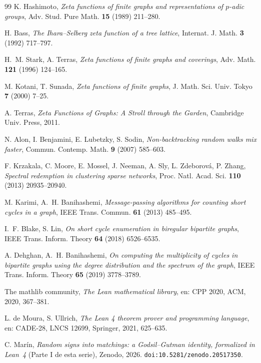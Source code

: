 \documentclass[11pt]{article}
\begin{document}
\begin{thebibliography}{99}
 K. Hashimoto,
\emph{Zeta functions of finite graphs and representations of $p$-adic groups},
Adv. Stud. Pure Math. \textbf{15} (1989) 211--280.

 H. Bass,
\emph{The Ihara--Selberg zeta function of a tree lattice},
Internat. J. Math. \textbf{3} (1992) 717--797.

 H.~M. Stark, A. Terras,
\emph{Zeta functions of finite graphs and coverings}, Adv. Math. \textbf{121} (1996)
124--165.

 M. Kotani, T. Sunada,
\emph{Zeta functions of finite graphs}, J. Math. Sci. Univ. Tokyo \textbf{7} (2000) 7--25.

 A. Terras,
\emph{Zeta Functions of Graphs: A Stroll through the Garden}, Cambridge Univ. Press, 2011.

 N. Alon, I. Benjamini, E. Lubetzky, S. Sodin,
\emph{Non-backtracking random walks mix faster}, Commun. Contemp. Math. \textbf{9} (2007)
585--603.

 F. Krzakala, C. Moore, E. Mossel, J. Neeman, A. Sly, L. Zdeborov\'a,
P. Zhang, \emph{Spectral redemption in clustering sparse networks},
Proc. Natl. Acad. Sci. \textbf{110} (2013) 20935--20940.

 M. Karimi, A.~H. Banihashemi,
\emph{Message-passing algorithms for counting short cycles in a graph},
IEEE Trans. Commun. \textbf{61} (2013) 485--495.

 I.~F. Blake, S. Lin,
\emph{On short cycle enumeration in biregular bipartite graphs},
IEEE Trans. Inform. Theory \textbf{64} (2018) 6526--6535.

 A. Dehghan, A.~H. Banihashemi,
\emph{On computing the multiplicity of cycles in bipartite graphs using the degree
distribution and the spectrum of the graph}, IEEE Trans. Inform. Theory \textbf{65} (2019)
3778--3789.

 The mathlib community,
\emph{The Lean mathematical library}, en: CPP 2020, ACM, 2020, 367--381.

 L. de Moura, S. Ullrich,
\emph{The Lean 4 theorem prover and programming language}, en: CADE-28, LNCS 12699,
Springer, 2021, 625--635.

 C. Mar\'in,
\emph{Random signs into matchings: a Godsil--Gutman identity, formalized in Lean~4}
(Parte I de esta serie), Zenodo, 2026. \texttt{doi:10.5281/zenodo.20517350}.


\end{thebibliography}
\end{document}
